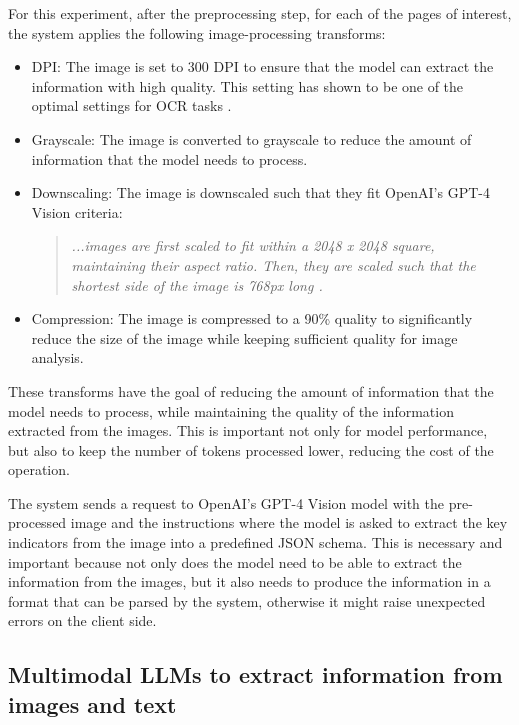 \documentclass[english, 12pt, a4paper, elec, utf8, a-2b, online]{aaltothesis}
\begin{document}
For this experiment, after the preprocessing step, for each of the pages of interest, the system applies the following image-processing transforms:

\begin{itemize}
\label{list:image_transforms}
    \item \ac{DPI}: The image is set to 300 \ac{DPI} to ensure that the model can extract the information with high quality. This setting has shown to be one of the optimal settings for \ac{OCR} tasks \cite{ocr_preprocessing2007}.
    \item Grayscale: The image is converted to grayscale to reduce the amount of information that the model needs to process.
    \item Downscaling: The image is downscaled such that they fit OpenAI's \ac{GPT}-4 Vision criteria:
    \begin{quote}
        \textit{...images are first scaled to fit within a 2048 x 2048 square, maintaining their aspect ratio. Then, they are scaled such that the shortest side of the image is 768px long \cite{OpenAIVisionAPI}.}
    \end{quote}
    \item Compression: The image is compressed to a 90\% quality to significantly reduce the size of the image while keeping sufficient quality for image analysis.
\end{itemize}

These transforms have the goal of reducing the amount of information that the model needs to process, while maintaining the quality of the information extracted from the images.
This is important not only for model performance, but also to keep the number of tokens processed lower, reducing the cost of the operation.

The system sends a request to OpenAI's \ac{GPT}-4 Vision model with the pre-processed image and the instructions where the model is asked to extract the key indicators from the image into a predefined JSON schema.
This is necessary and important because not only does the model need to be able to extract the information from the images, but it also needs to produce the information in a format that can be parsed by the system, otherwise it might raise unexpected errors on the client side.

\subsection{Multimodal LLMs to extract information from images and text}
\end{document}

